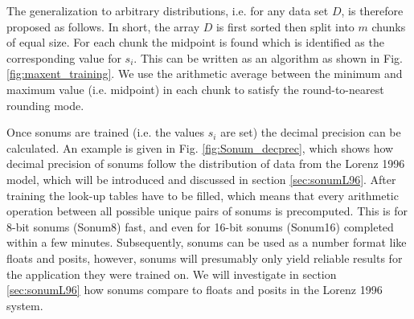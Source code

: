 The generalization to arbitrary distributions, i.e. for any data set $D$, is therefore proposed as follows. In short, the array $D$ is first sorted then split into $m$ chunks of equal size. For each chunk the midpoint is found which is identified as the corresponding value for $s_i$. This can be written as an algorithm as shown in Fig. \ref{fig:maxent_training}. We use the arithmetic average between the minimum and maximum value (i.e. midpoint) in each chunk to satisfy the round-to-nearest rounding mode.

%
%
%
%
%
%

Once sonums are trained (i.e. the values $s_i$ are set) the decimal precision can be calculated. An example is given in Fig. \ref{fig:Sonum_decprec}, which shows how decimal precision of sonums follow the distribution of data from the Lorenz 1996 model, which will be introduced and discussed in section \ref{sec:sonumL96}. After training the look-up tables have to be filled, which means that every arithmetic operation between all possible unique pairs of sonums is precomputed. This is for 8-bit sonums (Sonum8) fast, and even for 16-bit sonums (Sonum16) completed within a few minutes. Subsequently, sonums can be used as a number format like floats and posits, however, sonums will presumably only yield reliable results for the application they were trained on. We will investigate in section \ref{sec:sonumL96} how sonums compare to floats and posits in the Lorenz 1996 system.

